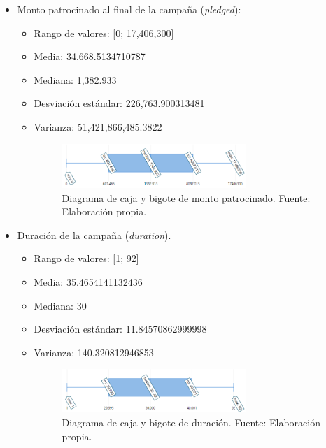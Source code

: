 \begin{itemize}
\begin{itemize}
\begin{figure}[!ht]
		\end{figure}
	\end{itemize}
	\item Monto patrocinado al final de la campaña (\textit{pledged}):
	\begin{itemize}
		\item Rango de valores: [0; 17,406,300]
		\item Media: 34,668.5134710787
		\item Mediana: 1,382.933
		\item Desviación estándar: 226,763.900313481
		\item Varianza: 51,421,866,485.3822
		\begin{figure}[!ht]
			\begin{center}
				\includegraphics[width=0.7\textwidth]{4/figures/caja_bigote_pledged.png}
				\caption{Diagrama de caja y bigote de monto patrocinado. Fuente: Elaboración propia.}
				\label{4:fig19}
			\end{center}
		\end{figure}
	\end{itemize}
	\item Duración de la campaña (\textit{duration}).
	\begin{itemize}
		\item Rango de valores: [1; 92]
		\item Media: 35.4654141132436
		\item Mediana: 30
		\item Desviación estándar: 11.84570862999998
		\item Varianza: 140.320812946853
		\begin{figure}[!ht]
			\begin{center}
				\includegraphics[width=0.7\textwidth]{4/figures/caja_bigote_duration.png}
				\caption{Diagrama de caja y bigote de duración. Fuente: Elaboración propia.}
				\label{4:fig20}
			\end{center}
		\end{figure}
	\end{itemize}
\end{itemize}

